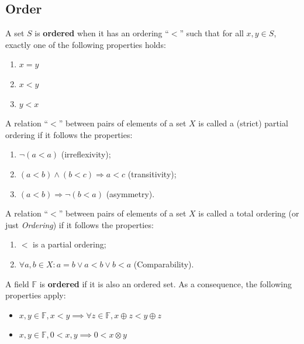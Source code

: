 \subsection{Order}

\begin{definition}
A set $S$ is \textbf{ordered} when it has an ordering ``$<$'' such that for all $x, y \in S$, exactly one of the following properties holds:
\begin{enumerate}
\item $x = y$
\item $x < y$
\item $y < x$
\end{enumerate}
\end{definition}

\begin{definition}
A relation ``$<$'' between pairs of elements of a set $X$ is called a (strict) partial ordering if it follows the properties:
\begin{enumerate}
\item $\neg(a<a)$ (irreflexivity);
\item $(a<b) \wedge (b<c) \Rightarrow a < c$ (transitivity);
\item $(a<b) \Rightarrow \neg(b<a)$ (asymmetry).
\end{enumerate}
\end{definition}

\begin{definition}
A relation ``$<$'' between pairs of elements of a set $X$ is called a total ordering (or just \textit{Ordering}) if it follows the properties:
\begin{enumerate}
\item $<$ is a partial ordering;
\item $\forall a, b \in X: a = b \lor a < b \lor b < a$ (Comparability).
\end{enumerate}
\end{definition}

\begin{definition}\label{def:ordered-fields}
A field $\mathbb{F}$ is \textbf{ordered} if it is also an ordered set. As a consequence, the following properties apply:
\begin{itemize}
\item $x, y \in \mathbb{F}, x < y \implies \forall z \in \mathbb{F}, x \oplus z < y \oplus z$
\item $x, y \in \mathbb{F}, 0 < x, y \implies 0 < x \otimes y$
\end{itemize}
\end{definition}

